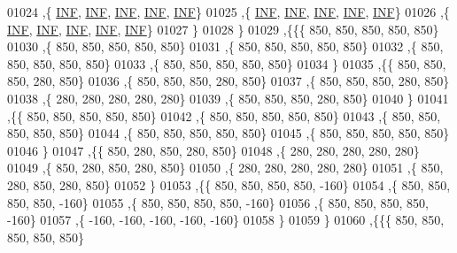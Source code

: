 \begin{DoxyCode}
01024    ,\{   \mbox{\hyperlink{1_88_84__epars_8h_a12c2040f25d8e3a7b9e1c2024c618cb6}{INF}},   \mbox{\hyperlink{1_88_84__epars_8h_a12c2040f25d8e3a7b9e1c2024c618cb6}{INF}},   \mbox{\hyperlink{1_88_84__epars_8h_a12c2040f25d8e3a7b9e1c2024c618cb6}{INF}},   \mbox{\hyperlink{1_88_84__epars_8h_a12c2040f25d8e3a7b9e1c2024c618cb6}{INF}},   \mbox{\hyperlink{1_88_84__epars_8h_a12c2040f25d8e3a7b9e1c2024c618cb6}{INF}}\}
01025    ,\{   \mbox{\hyperlink{1_88_84__epars_8h_a12c2040f25d8e3a7b9e1c2024c618cb6}{INF}},   \mbox{\hyperlink{1_88_84__epars_8h_a12c2040f25d8e3a7b9e1c2024c618cb6}{INF}},   \mbox{\hyperlink{1_88_84__epars_8h_a12c2040f25d8e3a7b9e1c2024c618cb6}{INF}},   \mbox{\hyperlink{1_88_84__epars_8h_a12c2040f25d8e3a7b9e1c2024c618cb6}{INF}},   \mbox{\hyperlink{1_88_84__epars_8h_a12c2040f25d8e3a7b9e1c2024c618cb6}{INF}}\}
01026    ,\{   \mbox{\hyperlink{1_88_84__epars_8h_a12c2040f25d8e3a7b9e1c2024c618cb6}{INF}},   \mbox{\hyperlink{1_88_84__epars_8h_a12c2040f25d8e3a7b9e1c2024c618cb6}{INF}},   \mbox{\hyperlink{1_88_84__epars_8h_a12c2040f25d8e3a7b9e1c2024c618cb6}{INF}},   \mbox{\hyperlink{1_88_84__epars_8h_a12c2040f25d8e3a7b9e1c2024c618cb6}{INF}},   \mbox{\hyperlink{1_88_84__epars_8h_a12c2040f25d8e3a7b9e1c2024c618cb6}{INF}}\}
01027    \}
01028   \}
01029  ,\{\{\{   850,   850,   850,   850,   850\}
01030    ,\{   850,   850,   850,   850,   850\}
01031    ,\{   850,   850,   850,   850,   850\}
01032    ,\{   850,   850,   850,   850,   850\}
01033    ,\{   850,   850,   850,   850,   850\}
01034    \}
01035   ,\{\{   850,   850,   850,   280,   850\}
01036    ,\{   850,   850,   850,   280,   850\}
01037    ,\{   850,   850,   850,   280,   850\}
01038    ,\{   280,   280,   280,   280,   280\}
01039    ,\{   850,   850,   850,   280,   850\}
01040    \}
01041   ,\{\{   850,   850,   850,   850,   850\}
01042    ,\{   850,   850,   850,   850,   850\}
01043    ,\{   850,   850,   850,   850,   850\}
01044    ,\{   850,   850,   850,   850,   850\}
01045    ,\{   850,   850,   850,   850,   850\}
01046    \}
01047   ,\{\{   850,   280,   850,   280,   850\}
01048    ,\{   280,   280,   280,   280,   280\}
01049    ,\{   850,   280,   850,   280,   850\}
01050    ,\{   280,   280,   280,   280,   280\}
01051    ,\{   850,   280,   850,   280,   850\}
01052    \}
01053   ,\{\{   850,   850,   850,   850,  -160\}
01054    ,\{   850,   850,   850,   850,  -160\}
01055    ,\{   850,   850,   850,   850,  -160\}
01056    ,\{   850,   850,   850,   850,  -160\}
01057    ,\{  -160,  -160,  -160,  -160,  -160\}
01058    \}
01059   \}
01060  ,\{\{\{   850,   850,   850,   850,   850\}

\end{DoxyCode}
